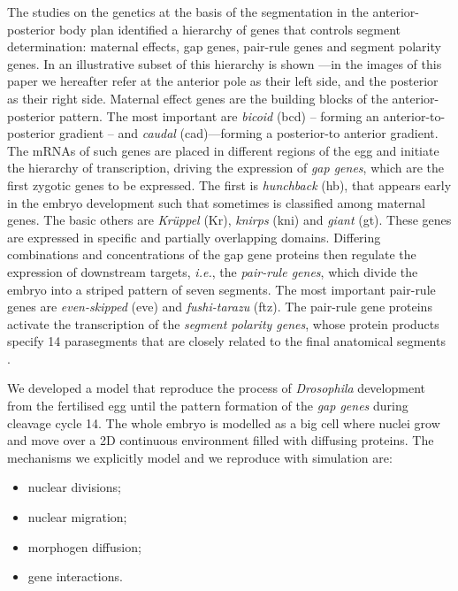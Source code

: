 \documentclass[12pt,a4paper,twoside,openright]{book}
\begin{document}
\noindent The studies on the genetics at the basis of the segmentation in the anterior-posterior body plan identified a hierarchy of genes that controls segment determination: maternal effects, gap genes, pair-rule genes and segment polarity genes. In  an illustrative subset of this hierarchy is shown ---in the images of this paper we hereafter refer at the anterior pole as their left side, and the posterior as their right side. 
%
Maternal effect genes are the building blocks of the anterior-posterior pattern. The most important are \emph{bicoid} (bcd)  -- forming an anterior-to-posterior gradient -- and \emph{caudal} (cad)---forming a posterior-to anterior gradient. 
%
The mRNAs of such genes are placed in different regions of the egg and initiate the hierarchy of transcription, driving the expression of \emph{gap genes}, which are the first zygotic genes to be expressed. The first is \emph{hunchback} (hb), that appears early in the embryo development such that sometimes is classified among maternal genes. The basic others are \emph{Kr\"{u}ppel} (Kr), \emph{knirps} (kni) and \emph{giant} (gt).
%
These genes are expressed in specific and partially overlapping domains. 
%
Differing combinations and concentrations of the gap gene proteins then regulate the expression of downstream targets, \emph{i.e.}, the \emph{pair-rule genes}, which divide the embryo into a striped pattern of seven segments. The most important pair-rule genes are  \emph{even-skipped} (eve) and  \emph{fushi-tarazu} (ftz).
%
The pair-rule gene proteins activate the transcription of the \emph{segment polarity genes},  whose protein products specify 14 parasegments that are closely related to the final anatomical segments \cite{alberts}.

We developed a model that reproduce the process of \emph{Drosophila} development from the fertilised egg until the pattern formation of the \emph{gap genes} during cleavage cycle 14.
%
The whole embryo is modelled as a big cell where nuclei grow and move over a 2D continuous environment filled with diffusing proteins.
%
The mechanisms we explicitly model and we reproduce with simulation are:
\begin{itemize}
 \item nuclear divisions;
 \item nuclear migration;
 \item morphogen diffusion;
 \item gene interactions.
\end{itemize}
\end{document}
